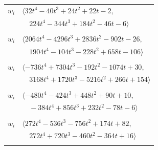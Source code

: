 \documentclass[11pt]{article}
\begin{document}
\begin{longtable}{@{}ll@{}}
$w_i$ & $\langle 32t^{4}-40t^{3}+24t^{2}+22t-2,$\\
 & $\quad 224t^{4}-344t^{3}+184t^{2}-46t-6\rangle$\\
\addlinespace[2pt]
\multicolumn{2}{@{}p{0.97\textwidth}@{}}{$i=20$, $D_i=8$, $\rho_{ij}$: $3{:}1, \allowbreak 5{:}1, \allowbreak 6{:}2, \allowbreak 8{:}2, \allowbreak 11{:}2, \allowbreak 17{:}3, \allowbreak 31{:}1, \allowbreak 33{:}2, \allowbreak 35{:}1, \allowbreak 36{:}3, \allowbreak 48{:}1, \allowbreak 51{:}2, \allowbreak 53{:}3, \allowbreak 57{:}1, \allowbreak 64{:}2, \allowbreak 68{:}2, \allowbreak 72{:}2$}\\
$w_i$ & $\langle 2064t^{4}-4296t^{3}+2836t^{2}-902t-26,$\\
 & $\quad 1904t^{4}-104t^{3}-228t^{2}+658t-106\rangle$\\
\addlinespace[2pt]
\multicolumn{2}{@{}p{0.97\textwidth}@{}}{$i=21$, $D_i=4$, $\rho_{ij}$: $3{:}2, \allowbreak 5{:}1, \allowbreak 6{:}3, \allowbreak 7{:}3, \allowbreak 15{:}3, \allowbreak 25{:}1, \allowbreak 26{:}3, \allowbreak 39{:}2, \allowbreak 40{:}1, \allowbreak 49{:}2, \allowbreak 51{:}3, \allowbreak 52{:}2, \allowbreak 56{:}3, \allowbreak 68{:}1$}\\
$w_i$ & $\langle -736t^{4}+7304t^{3}-192t^{2}-1074t+30,$\\
 & $\quad 3168t^{4}+1720t^{3}-5216t^{2}+266t+154\rangle$\\
\addlinespace[2pt]
\multicolumn{2}{@{}p{0.97\textwidth}@{}}{$i=22$, $D_i=2$, $\rho_{ij}$: $2{:}3, \allowbreak 5{:}2, \allowbreak 8{:}3, \allowbreak 10{:}2, \allowbreak 14{:}3, \allowbreak 17{:}1, \allowbreak 18{:}2, \allowbreak 37{:}1, \allowbreak 39{:}2, \allowbreak 43{:}2, \allowbreak 48{:}3, \allowbreak 52{:}1$}\\
$w_i$ & $\langle -480t^{4}-424t^{3}+448t^{2}+90t+10,$\\
 & $\quad -384t^{4}+856t^{3}+232t^{2}-78t-6\rangle$\\
\addlinespace[2pt]
\multicolumn{2}{@{}p{0.97\textwidth}@{}}{$i=23$, $D_i=1$, $\rho_{ij}$: $3{:}2, \allowbreak 6{:}3, \allowbreak 12{:}2, \allowbreak 14{:}3, \allowbreak 16{:}2, \allowbreak 17{:}1, \allowbreak 19{:}1, \allowbreak 24{:}2, \allowbreak 27{:}3, \allowbreak 31{:}1, \allowbreak 35{:}3, \allowbreak 36{:}1, \allowbreak 37{:}1, \allowbreak 46{:}3$}\\
$w_i$ & $\langle 272t^{4}-536t^{3}-756t^{2}+174t+82,$\\
 & $\quad 272t^{4}+720t^{3}-460t^{2}-364t+16\rangle$\\
\addlinespace[2pt]
\multicolumn{2}{@{}p{0.97\textwidth}@{}}{$i=24$, $D_i=4$, $\rho_{ij}$: $4{:}1, \allowbreak 7{:}2, \allowbreak 14{:}1, \allowbreak 16{:}2, \allowbreak 18{:}3, \allowbreak 23{:}2, \allowbreak 25{:}1, \allowbreak 35{:}2, \allowbreak 36{:}3, \allowbreak 40{:}2, \allowbreak 43{:}2, \allowbreak 51{:}1, \allowbreak 54{:}3, \allowbreak 60{:}1, \allowbreak 63{:}1, \allowbreak 65{:}3, \allowbreak 70{:}2$}\\

\end{longtable}
\end{document}
